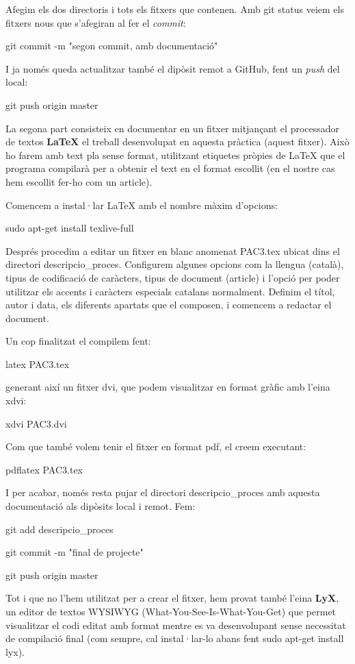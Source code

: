 \documentclass{article}
\begin{document}
Afegim els dos directoris i tots els fitxers que contenen. Amb git status veiem els fitxers nous que s'afegiran al fer el \textit{commit}:\bigskip

\qquad git commit -m "segon commit, amb documentació"\bigskip

I ja només queda actualitzar també el dipòsit remot a GitHub, fent un \textit{push} del local:\bigskip

\qquad git push origin master\bigskip

La segona part consisteix en documentar en un fitxer mitjançant el processador de textos \textbf{LaTeX} el treball desenvolupat en aquesta pràctica (aquest fitxer). Això ho farem amb text pla sense format, utilitzant etiquetes pròpies de LaTeX que el programa compilarà per a obtenir el text en el format escollit (en el nostre cas hem escollit fer-ho com un article).\bigskip

Comencem a instal·lar LaTeX amb el nombre màxim d'opcions: \bigskip

\qquad sudo apt-get install texlive-full \bigskip  

Després procedim a editar un fitxer en blanc anomenat PAC3.tex ubicat dins el directori descripcio\_proces. Configurem algunes opcions com la llengua (català), tipus de codificació de caràcters, tipus de document (article) i l'opció per poder utilitzar els accents i caràcters especials catalans normalment. Definim el títol, autor i data, els diferents apartats que el composen, i comencem a redactar el document. \bigskip
    
Un cop finalitzat el compilem fent:\bigskip

\qquad latex PAC3.tex\bigskip

generant així un fitxer dvi, que podem visualitzar en format gràfic amb l'eina xdvi:\bigskip

\qquad xdvi PAC3.dvi\bigskip

Com que també volem tenir el fitxer en format pdf, el creem executant:\bigskip

\qquad pdflatex PAC3.tex\bigskip

I per acabar, només resta pujar el directori descripcio\_proces amb aquesta documentació als dipòsits local i remot. Fem:\bigskip

\qquad git add descripcio\_proces \bigskip

\qquad git commit -m "final de projecte"\bigskip

\qquad git push origin master \bigskip

Tot i que no l'hem utilitzat per a crear el fitxer, hem provat també l'eina \textbf{LyX}, un editor de textos WYSIWYG (What-You-See-Is-What-You-Get) que permet visualitzar el codi editat amb format mentre es va desenvolupant sense necessitat de compilació final (com sempre, cal instal·lar-lo abans fent sudo apt-get install lyx).
\newpage
\end{document}
